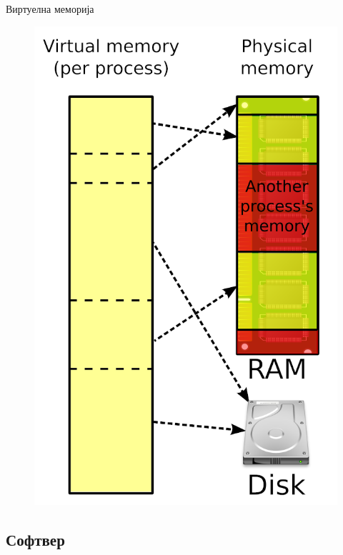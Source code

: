 \documentclass[xcolor=table]{beamer}
\begin{document}
\begin{frame}[allowframebreaks]{Виртуелна меморија}
        \begin{figure}
            \centering
            \includegraphics[width=\textwidth,height=0.8\textheight,keepaspectratio]{images/virtmem.png}
            \label{fig:virtmem}
        \end{figure}
    \end{frame}
    
    \subsection{Софтвер}
    
\end{document}
